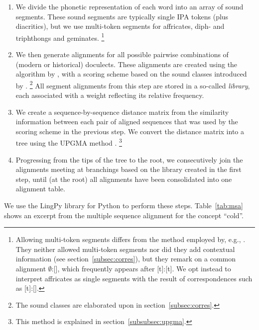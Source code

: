 \documentclass[a4paper]{article}
\begin{document}
\begin{enumerate}
\item
We divide the phonetic representation of each word into an array of sound segments.
These sound segments are typically single IPA tokens (plus diacritics),
but we use multi-token segments for affricates, diph- and triphthongs and geminates.%
\footnote{%
Allowing multi-token segments differs from
the method employed by, e.g., \citet{wieling2010hierarchical}.
They neither allowed multi-token segments nor did they add contextual information
(see section~\ref{subsec:corres}),
but they remark on a common alignment $\emptyset$:[\textesh],
which frequently appears after [t]:[t].
We opt instead to interpret affricates as single segments with
the result of correspondences such as [t]:[].
}

\item
We then generate alignments for all possible pairwise combinations
of (modern or historical) doculects.
These alignments are created using the algorithm by \citet{needleman1970general},
with a scoring scheme based on the sound classes introduced by \citet{list2012sca}.%
\footnote{%
The sound classes are elaborated upon in section~\ref{subsec:corres}.
}
All segment alignments from this step are stored in a so-called \textit{library},
each associated with a weight reflecting its relative frequency.

\item
We create a sequence-by-sequence distance matrix
from the similarity information between each pair of aligned sequences
that was used by the scoring scheme in the previous step.
We convert the distance matrix into a tree using the UPGMA method \citep{sokal1958statistical}.%
\footnote{This method is explained in section~\ref{subsubsec:upgma}.}

\item 
Progressing from the tips of the tree to the root,
we consecutively join the alignments meeting at branchings
based on the library created in the first step,
until (at the root) all alignments have been consolidated into one alignment table.
\end{enumerate}

We use the LingPy library for Python \citep{list2018lingpy} to perform these steps.
Table~\ref{tab:msa}
shows an excerpt from the multiple sequence alignment for the concept ``cold''.
\end{document}
